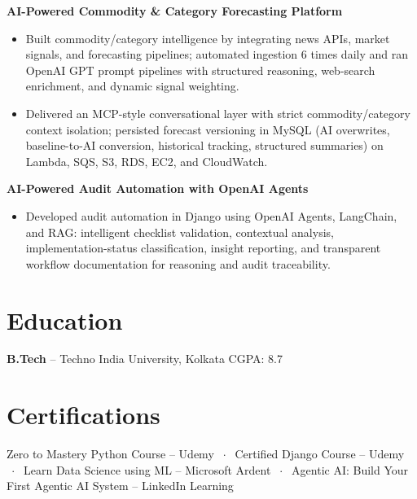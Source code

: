 \documentclass[10pt,a4paper]{article}
\newcommand{\resumeItem}[1]{\item \small #1}
\newcommand{\projectHeading}[1]{%
  \vspace{3pt}%
  \textbf{\small\color{primary}#1}\\[-2pt]
}
\begin{document}
\projectHeading{AI-Powered Commodity \& Category Forecasting Platform}
\begin{itemize}
  \resumeItem{Built commodity/category intelligence by integrating news APIs, market signals, and forecasting pipelines; automated ingestion 6 times daily and ran OpenAI GPT prompt pipelines with structured reasoning, web-search enrichment, and dynamic signal weighting.}
  \resumeItem{Delivered an MCP-style conversational layer with strict commodity/category context isolation; persisted forecast versioning in MySQL (AI overwrites, baseline-to-AI conversion, historical tracking, structured summaries) on Lambda, SQS, S3, RDS, EC2, and CloudWatch.}
\end{itemize}

\projectHeading{AI-Powered Audit Automation with OpenAI Agents}
\begin{itemize}
  \resumeItem{Developed audit automation in Django using OpenAI Agents, LangChain, and RAG: intelligent checklist validation, contextual analysis, implementation-status classification, insight reporting, and transparent workflow documentation for reasoning and audit traceability.}
\end{itemize}

\section{Education}
\small
\textbf{B.Tech} -- Techno India University, Kolkata \hfill CGPA: 8.7

\section{Certifications}
\small
Zero to Mastery Python Course -- Udemy $\;\cdot\;$ Certified Django Course -- Udemy $\;\cdot\;$ Learn Data Science using ML -- Microsoft Ardent $\;\cdot\;$ Agentic AI: Build Your First Agentic AI System -- LinkedIn Learning
\end{document}
